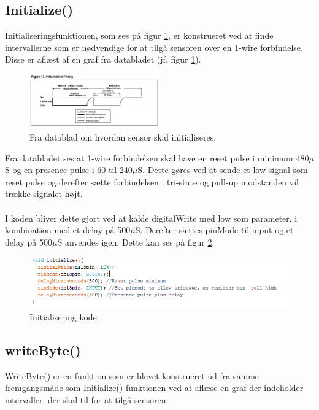 \subsection{Initialize()}
Initialiseringsfunktionen, som ses på figur \ref{sensor_kom}, er konstrueret ved at finde intervallerne som er nødvendige for at tilgå sensoren over en 1-wire forbindelse. Disse er aflæst af en graf fra databladet (jf. figur \ref{sensor_kom}).




\begin{figure}[h!]
  \centering
  \includegraphics[width=0.5\textwidth]{figures/Initialization_timing.png}
  \caption{Fra datablad om hvordan sensor skal initialiseres.}
  \label{sensor_kom}
\end{figure}

Fra databladet ses at 1-wire forbindelsen skal have en reset pulse i minimum 480$\mu$S og en presence pulse i 60 til 240$\mu$S. Dette gøres ved at sende et low signal som reset pulse og derefter sætte forbindelsen i tri-state og pull-up modstanden vil trække signalet højt. 
\\
\\
I koden bliver dette gjort ved at kalde digitalWrite med low som parameter, i kombination med et delay på 500$\mu$S. Derefter sættes pinMode til input og et delay på 500$\mu$S anvendes igen. Dette kan ses på figur \ref{sensor_kode}.

\begin{figure}[h!]
  \centering
  \includegraphics[width=1\textwidth]{figures/Init.png}
  \caption{Initialisering kode.}
  \label{sensor_kode}
\end{figure}


\subsection{writeByte()}
WriteByte() er en funktion som er blevet konstrueret ud fra samme fremgangsmåde som Initialize() funktionen ved at aflæse en graf der indeholder intervaller, der skal til for at tilgå sensoren.

